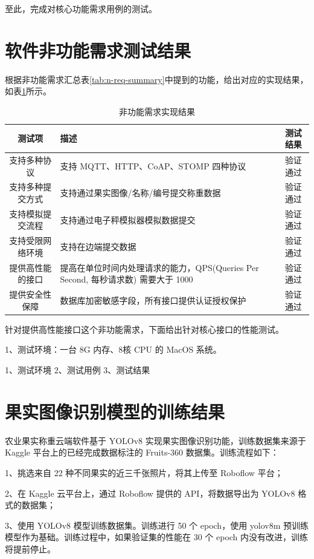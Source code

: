 至此，完成对核心功能需求用例的测试。

\section{软件非功能需求测试结果}

根据非功能需求汇总表\ref{tab:n-req-summary}中提到的功能，给出对应的实现结果，如表\ref{tab:test-n-req-summary}所示。

\begin{longtable}[ht]{|c|p{8cm}|c|}
\caption{非功能需求实现结果}
\label{tab:test-n-req-summary}
\\
\hline
测试项 & 描述 & 测试结果 \\\hline
支持多种协议 & 支持 MQTT、HTTP、CoAP、STOMP 四种协议 & 验证通过 \\\hline
支持多种提交方式 & 支持通过果实图像/名称/编号提交称重数据 & 验证通过 \\\hline
支持模拟提交流程 & 支持通过电子秤模拟器模拟数据提交 & 验证通过 \\\hline
支持受限网络环境 & 支持在边端提交数据 & 验证通过 \\\hline
提供高性能的接口 & 提高在单位时间内处理请求的能力，QPS(Queries Per Second, 每秒请求数) 需要大于 1000 & 验证通过 \\\hline
提供安全性保障 & 数据库加密敏感字段，所有接口提供认证授权保护 & 验证通过 \\\hline
\end{longtable}

针对提供高性能接口这个非功能需求，下面给出针对核心接口的性能测试。

1、测试环境：一台 8G 内存、8核 CPU 的 MacOS 系统。

1、测试环境
2、测试用例
3、测试结果

\section{果实图像识别模型的训练结果}\label{sec:test-model}

农业果实称重云端软件基于 YOLOv8 实现果实图像识别功能，训练数据集来源于 Kaggle 平台上的已经完成数据标注的 Fruits-360 数据集。训练流程如下：

1、挑选来自 22 种不同果实的近三千张照片，将其上传至 Roboflow 平台；

2、在 Kaggle 云平台上，通过 Roboflow 提供的 API，将数据导出为 YOLOv8 格式的数据集；

3、使用 YOLOv8 模型训练数据集。训练进行 50 个 epoch，使用 yolov8m 预训练模型作为基础。训练过程中，如果验证集的性能在 30 个 epoch 内没有改进，训练将提前停止。

